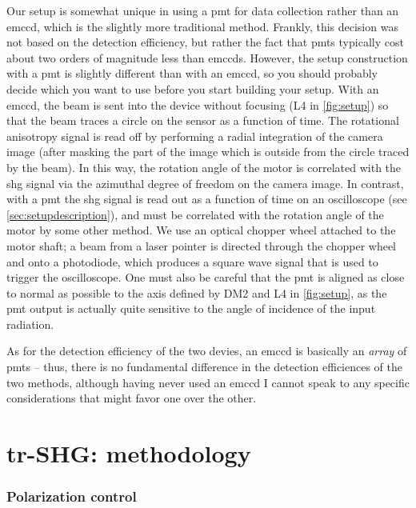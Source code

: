 Our setup is somewhat unique in using a \gls{pmt} for data collection rather than an \gls{emccd}, which is the slightly more traditional method.
Frankly, this decision was not based on the detection efficiency, but rather the fact that \glspl{pmt} typically cost about two orders of magnitude less than \glspl{emccd}.
However, the setup construction with a \gls{pmt} is slightly different than with an \gls{emccd}, so you should probably decide which you want to use before you start building your setup.
With an \gls{emccd}, the beam is sent into the device without focusing (L4 in \cref{fig:setup}) so that the beam traces a circle on the sensor as a function of time\cite{harter_high-speed_2015}.
The rotational anisotropy signal is read off by performing a radial integration of the camera image (after masking the part of the image which is outside from the circle traced by the beam).
In this way, the rotation angle of the motor is correlated with the \gls{shg} signal via the azimuthal degree of freedom on the camera image.
In contrast, with a \gls{pmt} the \gls{shg} signal is read out as a function of time on an oscilloscope (see \cref{sec:setupdescription}), and must be correlated with the rotation angle of the motor by some other method.
We use an optical chopper wheel attached to the motor shaft; a beam from a laser pointer is directed through the chopper wheel and onto a photodiode, which produces a square wave signal that is used to trigger the oscilloscope.
One must also be careful that the \gls{pmt} is aligned as close to normal as possible to the axis defined by DM2 and L4 in \cref{fig:setup}, as the \gls{pmt} output is actually quite sensitive to the angle of incidence of the input radiation.

As for the detection efficiency of the two devies, an \gls{emccd} is basically an \emph{array} of \glspl{pmt} -- thus, there is no fundamental difference in the detection efficiences of the two methods, although having never used an \gls{emccd} I cannot speak to any specific considerations that might favor one over the other.

\section{tr-SHG: methodology}

\subsubsection{Polarization control}

